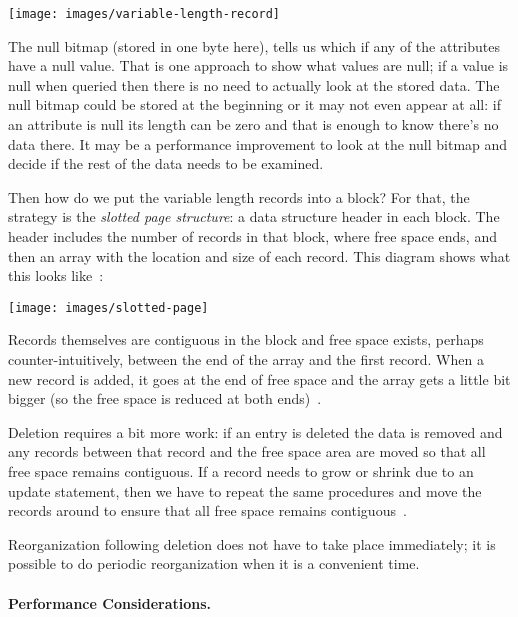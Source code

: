 \documentclass[a4paper]{report}
\begin{document}
\begin{center}
\texttt{[image: images/variable-length-record]}
\end{center}

The null bitmap (stored in one byte here), tells us which if any of the attributes have a null value. That is one approach to show what values are null; if a value is null when queried then there is no need to actually look at the stored data. The null bitmap could be stored at the beginning or it may not even appear at all: if an attribute is null its length can be zero and that is enough to know there's no data there. It may be a performance improvement to look at the null bitmap and decide if the rest of the data needs to be examined.

Then how do we put the variable length records into a block? For that, the strategy is the \textit{slotted page structure}: a data structure header in each block. The header includes the number of records in that block, where free space ends, and then an array with the location and size of each record. This diagram shows what this looks like~\cite{dsc}:

\begin{center}
\texttt{[image: images/slotted-page]}
\end{center}

Records themselves are contiguous in the block and free space exists, perhaps counter-intuitively, between the end of the array and the first record. When a new record is added, it goes at the end of free space and the array gets a little bit bigger (so the free space is reduced at both ends)~\cite{dsc}. 

Deletion requires a bit more work: if an entry is deleted the data is removed and any records between that record and the free space area are moved so that all free space remains contiguous. If a record needs to grow or shrink due to an update statement, then we have to repeat the same procedures and move the records around to ensure that all free space remains contiguous~\cite{dsc}. 

Reorganization following deletion does not have to take place immediately; it is possible to do periodic reorganization when it is a convenient time.

\paragraph{Performance Considerations.}
\end{document}
